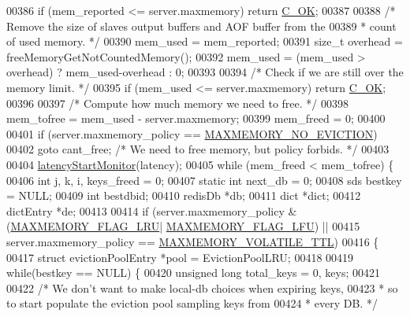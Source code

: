 \begin{DoxyCode}
00386     \textcolor{keywordflow}{if} (mem\_reported <= server.maxmemory) \textcolor{keywordflow}{return} \hyperlink{server_8h_a303769ef1065076e68731584e758d3e1}{C\_OK};
00387 
00388     \textcolor{comment}{/* Remove the size of slaves output buffers and AOF buffer from the}
00389 \textcolor{comment}{     * count of used memory. */}
00390     mem\_used = mem\_reported;
00391     size\_t overhead = freeMemoryGetNotCountedMemory();
00392     mem\_used = (mem\_used > overhead) ? mem\_used-overhead : 0;
00393 
00394     \textcolor{comment}{/* Check if we are still over the memory limit. */}
00395     \textcolor{keywordflow}{if} (mem\_used <= server.maxmemory) \textcolor{keywordflow}{return} \hyperlink{server_8h_a303769ef1065076e68731584e758d3e1}{C\_OK};
00396 
00397     \textcolor{comment}{/* Compute how much memory we need to free. */}
00398     mem\_tofree = mem\_used - server.maxmemory;
00399     mem\_freed = 0;
00400 
00401     \textcolor{keywordflow}{if} (server.maxmemory\_policy == \hyperlink{server_8h_a418e5a222cf659c003df77830f1ae343}{MAXMEMORY\_NO\_EVICTION})
00402         \textcolor{keywordflow}{goto} cant\_free; \textcolor{comment}{/* We need to free memory, but policy forbids. */}
00403 
00404     \hyperlink{latency_8h_a87d7b5b368dad97457f13466d760b0e1}{latencyStartMonitor}(latency);
00405     \textcolor{keywordflow}{while} (mem\_freed < mem\_tofree) \{
00406         \textcolor{keywordtype}{int} j, k, i, keys\_freed = 0;
00407         \textcolor{keyword}{static} \textcolor{keywordtype}{int} next\_db = 0;
00408         sds bestkey = NULL;
00409         \textcolor{keywordtype}{int} bestdbid;
00410         redisDb *db;
00411         dict *dict;
00412         dictEntry *de;
00413 
00414         \textcolor{keywordflow}{if} (server.maxmemory\_policy & (\hyperlink{server_8h_a9f9503e7c7ba52df66b097c2b0b4c6d0}{MAXMEMORY\_FLAG\_LRU}|
      \hyperlink{server_8h_aac2d3ad7a604f87e06e25233dbd01c9b}{MAXMEMORY\_FLAG\_LFU}) ||
00415             server.maxmemory\_policy == \hyperlink{server_8h_a463db85c87bf7ecf91e3f9d182397969}{MAXMEMORY\_VOLATILE\_TTL})
00416         \{
00417             \textcolor{keyword}{struct} evictionPoolEntry *pool = EvictionPoolLRU;
00418 
00419             \textcolor{keywordflow}{while}(bestkey == NULL) \{
00420                 \textcolor{keywordtype}{unsigned} \textcolor{keywordtype}{long} total\_keys = 0, keys;
00421 
00422                 \textcolor{comment}{/* We don't want to make local-db choices when expiring keys,}
00423 \textcolor{comment}{                 * so to start populate the eviction pool sampling keys from}
00424 \textcolor{comment}{                 * every DB. */}

\end{DoxyCode}
